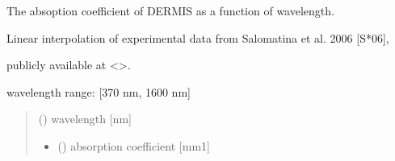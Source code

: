 \documentclass[letterpaper,10pt,english]{sphinxmanual}
\begin{document}
\begin{fulllineitems}
\label{\detokenize{03_absorption_coefficient:skinoptics.absorption_coefficient.mua_DE_Salomatina}}
\pysigstartsignatures
{}
\pysigstopsignatures
\begin{DUlineblock}{0em}
\item[] The absoption coefficient of DERMIS as a function of wavelength.
\item[] Linear interpolation of experimental data from Salomatina et al. 2006 {[}S*06{]},
\item[] publicly available at \textless{}\textgreater{}.
\end{DUlineblock}

\begin{DUlineblock}{0em}
\item[] wavelength range: {[}370 nm, 1600 nm{]}
\end{DUlineblock}
\begin{quote}\begin{description}
\sphinxAtStartPar
{} () \textendash{} wavelength {[}nm{]}

\sphinxAtStartPar
\begin{itemize}
\item {} 
\sphinxAtStartPar
{} () \textendash{} absorption coefficient {[}mm\sphinxhyphen{}1{]}

\end{itemize}


\end{description}\end{quote}

\end{fulllineitems}

\end{document}
